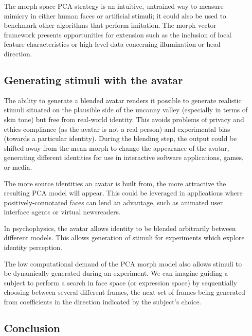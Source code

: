 \documentclass[runningheads]{llncs}
\begin{document}
The morph space PCA strategy is an intuitive, untrained way to measure mimicry in either human faces or artificial stimuli\cite{cook2012self}; it could also be used to benchmark other algorithms that perform imitation. The morph vector framework presents opportunities for extension such as the inclusion of local feature characteristics or high-level data concerning illumination or head direction.

\subsection{Generating stimuli with the avatar}

The ability to generate a blended avatar renders it possible to generate realistic stimuli situated on the plausible side of the uncanny valley\cite{mori1970uncanny} (especially in terms of skin tone) but free from real-world identity. This avoids problems of privacy and ethics compliance (as the avatar is not a real person) and experimental bias (towards a particular identity). During the blending step, the output could be shifted away from the mean morph to change the appearance of the avatar, generating different identities for use in interactive software applications, games, or media.

The more source identities an avatar is built from, the more attractive the resulting PCA model will appear\cite{grammer1994human}. This could be leveraged in applications where positively-connotated faces can lend an advantage, such as animated user interface agents or virtual newsreaders\cite{muller2001face}.

In psychophysics, the avatar allows identity to be blended arbitrarily between different models. This allows generation of stimuli for experiments which explore identity perception.

The low computational demand of the PCA morph model also allows stimuli to be dynamically generated during an experiment. We can imagine guiding a subject to perform a search in face space (or expression space) by sequentially choosing between several different frames, the next set of frames being generated from coefficients in the direction indicated by the subject's choice.

\subsection{Conclusion}
\end{document}
